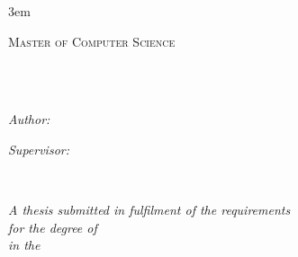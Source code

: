 \documentclass[
11pt, %
oneside, %
openany, %
english, %
singlespacing, %
liststotoc, %
toctotoc, %
headsepline, %
]{classes/ResearchTopic}
\author{Teklit \textsc{Haphtu}} %
\begin{document}
\emergencystretch 3em

\frontmatter %

\pagestyle{plain} %


\begin{titlepage}
\begin{center}

\vspace*{.06\textheight}
{\scshape\LARGE \univname\par}\vspace{1.5cm} %
\textsc{\Large Master of Computer Science}\\[0.5cm] %

\HRule \\[0.4cm] %
{\huge \bfseries \ttitle\par}\vspace{0.4cm} %
\HRule \\[1.5cm] %
 
\begin{minipage}[t]{0.4\textwidth}
\begin{flushleft} \large
\emph{Author:}\\
\href{http://www.makeitsimple.com}{\authorname} %
\end{flushleft}
\end{minipage}
\begin{minipage}[t]{0.4\textwidth}
\begin{flushright} \large
\emph{Supervisor:} \\
\href{https://people.utwente.nl/m.elhajj}{\supname} %
\end{flushright}
\end{minipage}\\[3cm]
 
\vfill

\vspace{-4cm}

\large \textit{A thesis submitted in fulfilment of the requirements\\ for the degree of \degreename}\\[0.3cm] %
\textit{in the}\\[0.4cm]
\groupname\\\deptname\\[2cm] %


\end{center}
\end{titlepage}
\end{document}
